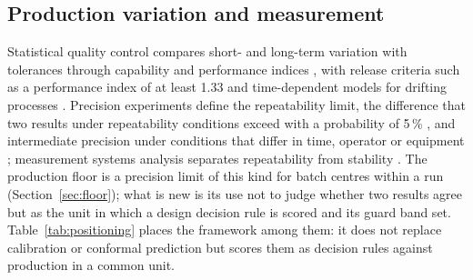 \documentclass[pdflatex,sn-basic,lineno]{sn-jnl}
\begin{document}
\subsection{Production variation and measurement}

Statistical quality control compares short- and long-term variation with tolerances through capability and performance indices \citep{montgomery2019introduction}, with release criteria such as a performance index of at least 1.33 \citep{aiag2006production} and time-dependent models for drifting processes \citep{iso2026process}. Precision experiments define the repeatability limit, the difference that two results under repeatability conditions exceed with a probability of 5\,\% \citep{iso2025repeatability}, and intermediate precision under conditions that differ in time, operator or equipment \citep{iso2023intermediate}; measurement systems analysis separates repeatability from stability \citep{aiag2010measurement}. The production floor is a precision limit of this kind for batch centres within a run (Section~\ref{sec:floor}); what is new is its use not to judge whether two results agree but as the unit in which a design decision rule is scored and its guard band set. Table~\ref{tab:positioning} places the framework among them: it does not replace calibration or conformal prediction but scores them as decision rules against production in a common unit.
\end{document}
